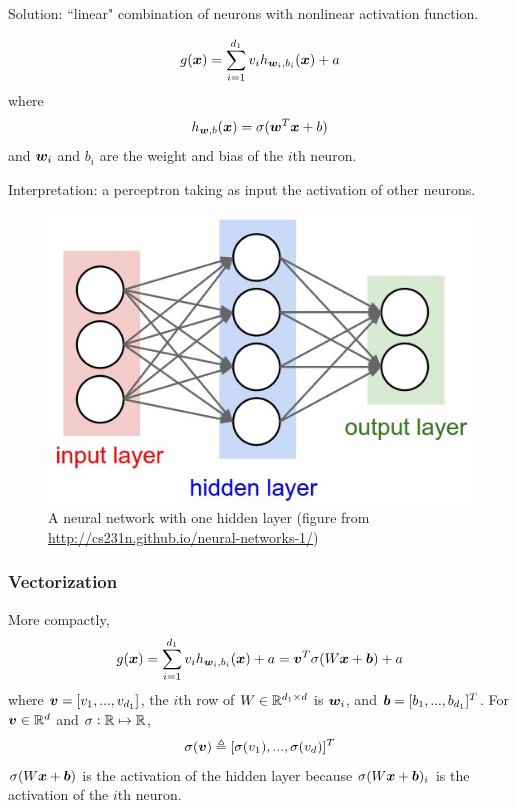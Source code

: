 \documentclass{beamer}
\begin{document}
\begin{frame}

Solution: ``linear" combination of neurons with nonlinear activation function.

\[
g({\bm x}) = \sum_{i = 1}^{d_1} v_i h_{{\bm w}_i, b_i} ({\bm x}) + a
\]
where
\[
h_{{\bm w}, b} ({\bm x}) = \sigma({\bm w}^T {\bm x} + b)
\]
and ${\bm w}_i$ and $b_i$ are the weight and bias of the $i$th neuron.

Interpretation: a perceptron taking as input the activation of other neurons.

\begin{figure}
\centering
\includegraphics[scale=0.2, valign=t]{neural_net}
\caption{A neural network with one hidden layer (figure from \url{http://cs231n.github.io/neural-networks-1/})}
\end{figure}

\end{frame}

\begin{frame}

\frametitle{Vectorization}

More compactly,
\[
g({\bm x})
= \sum_{i = 1}^{d_1} v_i h_{{\bm w}_i, b_i} ({\bm x}) + a
= {\bm v}^T \sigma (W {\bm x} + {\bm b}) + a
\]
where ${\bm v} = [v_1, ..., v_{d_1}]$, the $i$th row of $W \in {\mathbb R}^{d_1 \times d}$ is ${\bm w}_i$, and ${\bm b} = [b_1, ..., b_{d_1}]^T$.
For ${\bm v} \in {\mathbb R}^d$ and $\sigma: {\mathbb R} \mapsto {\mathbb R}$,
\[
\sigma ({\bm v}) \triangleq [\sigma (v_1), ..., \sigma (v_d)]^T
\]
$\sigma (W {\bm x} + {\bm b})$ is the activation of the hidden layer because $\sigma (W {\bm x} + {\bm b})_i$ is the activation of the $i$th neuron.

\end{frame}
\end{document}
